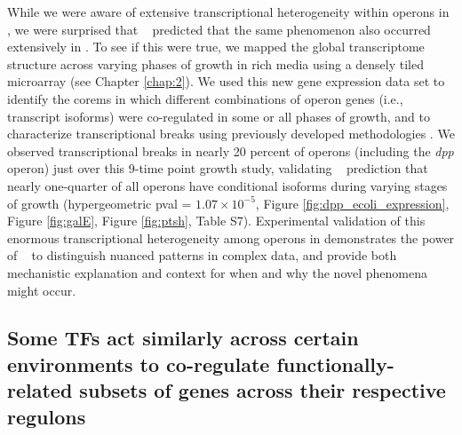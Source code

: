 While we were aware of extensive transcriptional heterogeneity within operons in \halo, we were surprised that \egrine~ predicted that the same phenomenon also occurred extensively in \eco. To see if this were true, we mapped the \eco global transcriptome structure across varying phases of growth in rich media using a densely tiled microarray (see Chapter \ref{chap:2}). We used this new gene expression data set to identify the corems in which different combinations of operon genes (i.e., transcript isoforms) were co-regulated in some or all phases of growth, and to characterize transcriptional breaks using previously developed methodologies \cite{koide_prevalence_2009}. We observed transcriptional breaks in nearly 20 percent of operons (including the \eco \textit{dpp} operon) just over this 9-time point growth study, validating \egrine~ prediction that nearly one-quarter of all \eco operons have conditional isoforms during varying stages of growth (hypergeometric pval = $1.07\times10^{-5}$, Figure \ref{fig:dpp_ecoli_expression}, Figure \ref{fig:galE}, Figure \ref{fig:ptsh}, Table S7). Experimental validation of this enormous transcriptional heterogeneity among operons in \eco demonstrates the power of \egrine~ to distinguish nuanced patterns in complex data, and provide both mechanistic explanation and context for when and why the novel phenomena might occur.

\subsection{Some TFs act similarly across certain environments to co-regulate functionally-related subsets of genes across their respective regulons}

